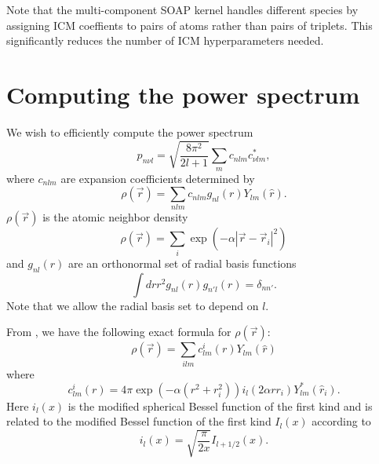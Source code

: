 \documentclass[%
preprint,
amsmath,amssymb,
aps,
]{revtex4-1}
\begin{document}
Note that the multi-component SOAP kernel handles different species by assigning ICM coeffients to pairs of atoms rather than pairs of triplets. This significantly reduces the number of ICM hyperparameters needed.


\section{Computing the power spectrum}
We wish to efficiently compute the power spectrum
\begin{equation}
p_{n \nu l} = \sqrt{\frac{8\pi^2}{2l+1}} \sum_m c_{nlm}c^*_{\nu l m},
\end{equation}
where $c_{nlm}$ are expansion coefficients determined by
\begin{equation}
    \rho(\vec{r}) = \sum_{nlm} c_{nlm} g_{nl}(r) Y_{lm}(\hat{r}).
\end{equation}
$\rho(\vec{r})$ is the atomic neighbor density
\begin{equation}
    \rho(\vec{r}) = \sum_i \exp(-\alpha |\vec{r} - \vec{r}_i|^2)
\end{equation}
and $g_{nl}(r)$ are an orthonormal set of radial basis functions
\begin{equation}
    \int dr r^2 g_{nl}(r) g_{n' l}(r) = \delta_{n n'}.
\end{equation}
Note that we allow the radial basis set to depend on $l$.


From \cite{bartok2013representing}, we have the following exact formula for $\rho(\vec{r})$:
\begin{equation}
    \rho(\vec{r}) = \sum_{ilm} c_{lm}^i(r) Y_{lm}(\hat{r})
\end{equation}
where
\begin{equation}
    c_{lm}^i(r) = 4\pi \exp(-\alpha(r^2+r_i^2)) i_l (2\alpha r r_i) Y_{lm}^*(\hat{r}_i).
\end{equation}
Here $i_l(x)$ is the modified spherical Bessel function of the first kind and is related to the modified Bessel function of the first kind $I_l(x)$ according to
\begin{equation}
    i_l(x) = \sqrt{\frac{\pi}{2 x}} I_{l+1/2}(x).
\end{equation}
\end{document}
